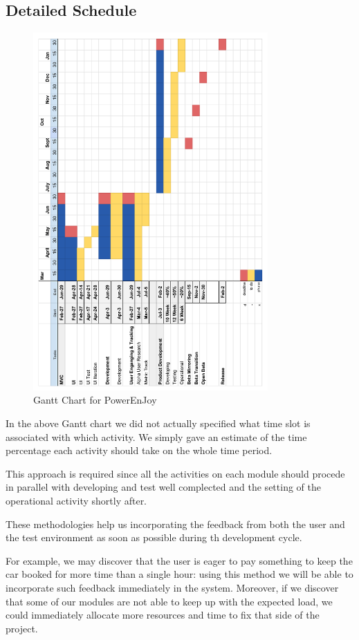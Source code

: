 \documentclass[11pt]{article} %
\newcommand{\pe}{PowerEnJoy }
\begin{document}
\subsection{Detailed Schedule}
\begin{figure}[H]
	\centering
	\includegraphics[width=0.8\textwidth]{GANTT/GANTT.png}
	\caption{Gantt Chart for \pe}
\end{figure}	

In the above Gantt chart we did not actually specified what time slot is associated with which activity. We simply gave an estimate of the time percentage each activity should take on the whole time period.

This approach is required since all the activities on each module should procede in parallel with developing and test well complected and the setting of the operational activity shortly after.

These methodologies help us incorporating the feedback from both the user and the test environment as soon as possible during th development cycle. 

For example, we may discover that the user is eager to pay something to keep the car booked for more time than a single hour: using this method we will be able to incorporate such feedback immediately in the system.
Moreover, if we discover that some of our modules are not able to keep up with the expected load, we could immediately allocate more resources and time to fix that side of the project.
\end{document}
